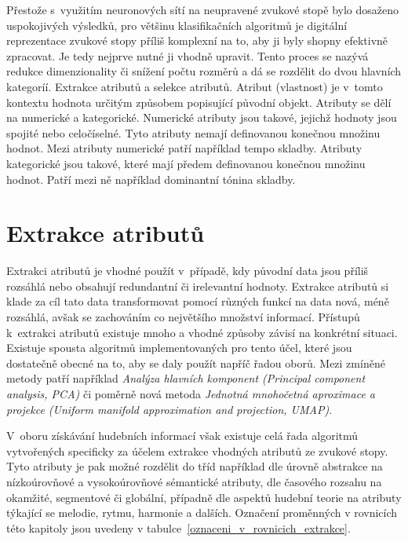 Přestože s~využitím neuronových sítí na neupravené zvukové stopě bylo dosaženo uspokojivých výsledků, pro většinu klasifikačních algoritmů je digitální reprezentace zvukové stopy příliš komplexní na to, aby ji byly shopny efektivně zpracovat. Je tedy nejprve nutné ji vhodně upravit. Tento proces se nazývá redukce dimenzionality či snížení počtu rozměrů a dá se rozdělit do dvou hlavních kategoríí. Extrakce atributů a selekce atributů. Atribut (vlastnost) je v~tomto kontextu hodnota určitým způsobem popisující původní objekt. Atributy se dělí na numerické a kategorické. Numerické atributy jsou takové, jejichž hodnoty jsou spojité nebo celočíselné. Tyto atributy nemají definovanou konečnou množinu hodnot. Mezi atributy numerické patří například tempo skladby. Atributy kategorické jsou takové, které mají předem definovanou konečnou množinu hodnot. Patří mezi ně například dominantní tónina skladby.\cite{MIR}\cite{8733572}\cite{aca}

\section{Extrakce atributů}
\label{extrakce_atributu}
Extrakci atributů je vhodné použít v~případě, kdy původní data jsou příliš rozsáhlá nebo obsahují redundantní či irelevantní hodnoty. Extrakce atributů si klade za cíl tato data transformovat pomocí různých funkcí na data nová, méně rozsáhlá, avšak se zachováním co největšího množství informací. Přístupů k~extrakci atributů existuje mnoho a vhodné způsoby závisí na konkrétní situaci. Existuje spousta algoritmů implementovaných pro tento účel, které jsou dostatečně obecné na to, aby se daly použít napříč řadou oborů. Mezi zmíněné metody patří například \textit{Analýza hlavních komponent (Principal component analysis, PCA)} či poměrně nová metoda \textit{Jednotná mnohočetná aproximace a projekce (Uniform manifold approximation and projection, UMAP)}.\cite{data_classification}\cite{lel2018umap}\cite{aca}

V~oboru získávání hudebních informací však existuje celá řada algoritmů vytvořených specificky za účelem extrakce vhodných atributů ze zvukové stopy. Tyto atributy je pak možné rozdělit do tříd například dle úrovně abstrakce na nízkoúrovňové a vysokoúrovňové sémantické atributy, dle časového rozsahu na okamžité, segmentové či globální, případně dle aspektů hudební teorie na atributy týkající se melodie, rytmu, harmonie a dalších. Označení proměnných v rovnicích této kapitoly jsou uvedeny v tabulce~\ref{oznaceni_v_rovnicich_extrakce}.\cite{MIR}\cite{aca}

